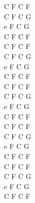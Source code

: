 \documentclass[a5paper, 10pt]{book}
\begin{document}
\begin{minipage}[t]{0.2\textwidth}
  C F C F\\
  C F C G\\
  e F C G\\
  C F C F\\

  C F C F\\
  C F C G\\
  e F C G\\
  C F C F\\

  C F C F\\
  C F C G\\
  e F C G\\
  C F C F\\

  C F C F\\
  C F C G\\
  e F C G\\
  C F C F\\

  C F C F\\
  C F C G\\
  e F C G\\
  C F C F\\

\end{minipage}

\newpage
\end{document}
